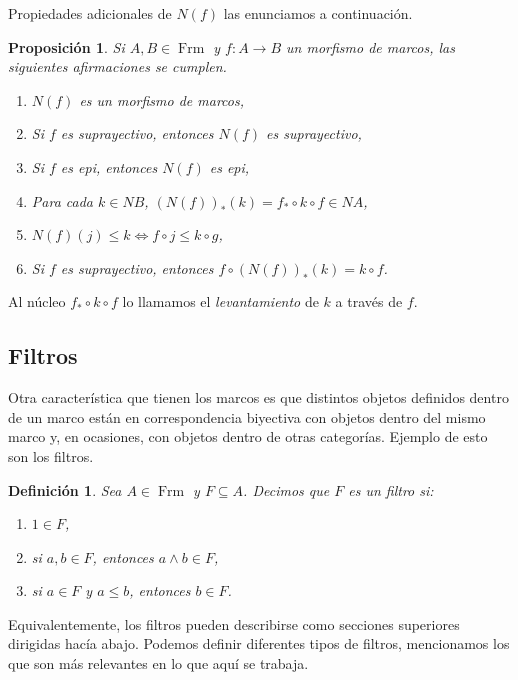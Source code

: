 \documentclass[12pt]{article}
\newtheorem{dfn}[thm]{Definición}
\newtheorem{prop}[thm]{Proposición}
\DeclareMathOperator{\Frm}{Frm}
\begin{document}
Propiedades adicionales de $N(f)$ las enunciamos a continuación.

\begin{prop}\label{levantamiento}
Si $A, B\in \Frm$ y $f\colon A\to B$ un morfismo de marcos, las siguientes afirmaciones se cumplen.
\begin{enumerate}
\item $N(f)$ es un morfismo de marcos,
\item Si $f$ es suprayectivo, entonces $N(f)$ es suprayectivo,
\item Si $f$ es epi, entonces $N(f)$ es epi,
\item Para cada $k\in NB$, $(N(f))_*(k)=f_*\circ k\circ f\in NA$,
\item $N(f)(j)\leq k\iff f\circ j\leq k\circ g$,
\item Si $f$ es suprayectivo, entonces $f\circ (N(f))_*(k)=k\circ f$.
\end{enumerate}
\end{prop}

Al núcleo $f_*\circ k\circ f$ lo llamamos el \emph{levantamiento} de $k$ a través de $f$.\\

\subsection{Filtros}
Otra característica que tienen los marcos es que distintos objetos definidos dentro de un marco están en correspondencia biyectiva con objetos dentro del mismo marco 
y, en ocasiones, con objetos dentro de otras categorías. Ejemplo de esto son los filtros.

\begin{dfn}\label{filtros}
Sea $A\in \Frm$ y $F\subseteq A$. Decimos que $F$ es un filtro si:
\begin{enumerate}
\item $1\in F$,
\item si $a, b\in F$, entonces $a\wedge b\in F$,
\item si $a\in F$ y $a\leq b$, entonces $b\in F$.
\end{enumerate}
\end{dfn}

Equivalentemente, los filtros pueden describirse como secciones superiores dirigidas hacía abajo. Podemos definir diferentes tipos de filtros, mencionamos los que son más relevantes en lo que aquí se trabaja.
\end{document}
